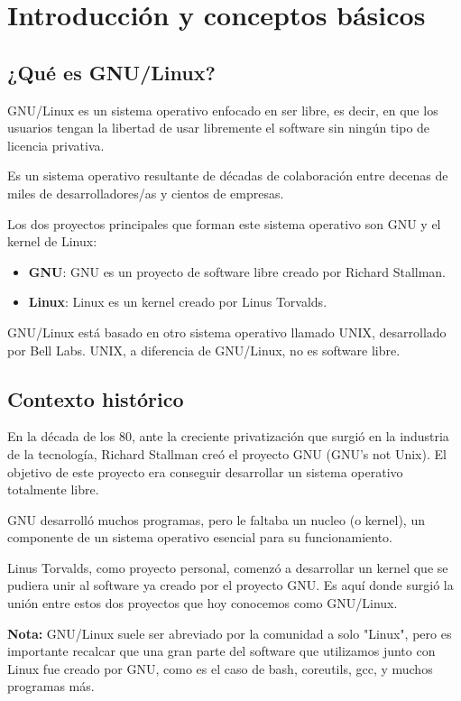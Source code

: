 \chapter{Introducción y conceptos básicos}
\section{¿Qué es GNU/Linux?}

GNU/Linux es un sistema operativo enfocado en ser libre, es decir, en que los usuarios tengan la libertad de usar libremente el software sin ningún tipo de licencia privativa.

Es un sistema operativo resultante de décadas de colaboración entre decenas de miles de desarrolladores/as y cientos de empresas. 

Los dos proyectos principales que forman este sistema operativo son GNU y el kernel de Linux:

\begin{itemize}
\item \textbf{GNU}: GNU es un proyecto de software libre creado por Richard Stallman.
\item \textbf{Linux}: Linux es un kernel creado por Linus Torvalds.
\end{itemize} 

GNU/Linux está basado en otro sistema operativo llamado UNIX, desarrollado por Bell Labs. UNIX, a diferencia de GNU/Linux, no es software libre.

\section{Contexto histórico}
En la década de los 80, ante la creciente privatización que surgió en la industria de la tecnología, Richard Stallman creó el proyecto GNU (GNU's not Unix). El objetivo de este proyecto era conseguir desarrollar un sistema operativo totalmente libre.

GNU desarrolló muchos programas, pero le faltaba un nucleo (o kernel), un componente de un sistema operativo esencial para su funcionamiento.

Linus Torvalds, como proyecto personal, comenzó a desarrollar un kernel que se pudiera unir al software ya creado por el proyecto GNU. Es aquí donde surgió la unión entre estos dos proyectos que hoy conocemos como GNU/Linux.

\textbf{Nota:} GNU/Linux suele ser abreviado por la comunidad a solo "Linux", pero es importante recalcar que una gran parte del software que utilizamos junto con Linux fue creado por GNU, como es el caso de bash, coreutils, gcc, y muchos programas más.

